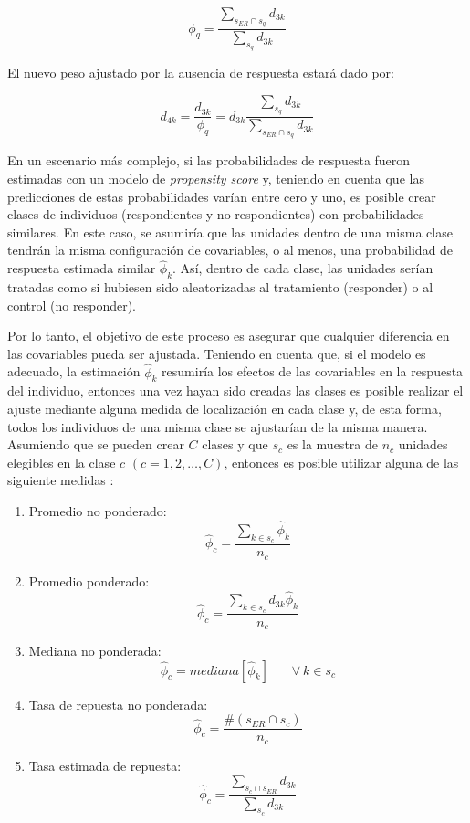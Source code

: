 \documentclass[
  12pt,
]{book}
\begin{document}
\[
\phi_{q} = \frac{\sum_{s_{ER}\cap s_q}d_{3k}}{\sum_{s_{q}}d_{3k}}
\]

El nuevo peso ajustado por la ausencia de respuesta estará dado por:

\[
d_{4k} = \frac{d_{3k}}{\phi_{q}} 
= d_{3k}\frac{\sum_{s_q}d_{3k}}{\sum_{s_{ER}\cap s_q}d_{3k}}
\]

En un escenario más complejo, si las probabilidades de respuesta fueron estimadas con un modelo de \emph{propensity score} y, teniendo en cuenta que las predicciones de estas probabilidades varían entre cero y uno, es posible crear clases de individuos (respondientes y no respondientes) con probabilidades similares. En este caso, se asumiría que las unidades dentro de una misma clase tendrán la misma configuración de covariables, o al menos, una probabilidad de respuesta estimada similar \(\hat\phi_k\). Así, dentro de cada clase, las unidades serían tratadas como si hubiesen sido aleatorizadas al tratamiento (responder) o al control (no responder).

Por lo tanto, el objetivo de este proceso es asegurar que cualquier diferencia en las covariables pueda ser ajustada. Teniendo en cuenta que, si el modelo es adecuado, la estimación \(\hat\phi_k\) resumiría los efectos de las covariables en la respuesta del individuo, entonces una vez hayan sido creadas las clases es posible realizar el ajuste mediante alguna medida de localización en cada clase y, de esta forma, todos los individuos de una misma clase se ajustarían de la misma manera. Asumiendo que se pueden crear \(C\) clases y que \(s_c\) es la muestra de \(n_c\) unidades elegibles en la clase \(c\) \((c=1, 2, \ldots, C)\), entonces es posible utilizar alguna de las siguiente medidas \citep{Valliant_Dever_2017}:

\begin{enumerate}
\def\labelenumi{\arabic{enumi}.}
\item
  Promedio no ponderado:
  \[\hat{\phi}_c = \frac{\sum_{k \in s_c}\hat{\phi}_k}{n_c}\]
\item
  Promedio ponderado:
  \[\hat{\phi}_c = \frac{\sum_{k \in s_c}d_{3k}\hat{\phi}_k}{n_c}\]
\item
  Mediana no ponderada:
  \[\hat{\phi}_c = mediana[\hat{\phi}_k]  \ \ \ \ \ \ \ \ \forall \ k  \in s_c\]
\item
  Tasa de repuesta no ponderada:
  \[\hat{\phi}_c = \frac{\#(s_{ER}\cap s_c)}{n_c}\]
\item
  Tasa estimada de repuesta:
  \[\hat{\phi}_c = \frac{\sum_{s_c \cap s_{ER}}d_{3k}}{\sum_{s_c}d_{3k}}\]
\end{enumerate}
\end{document}
